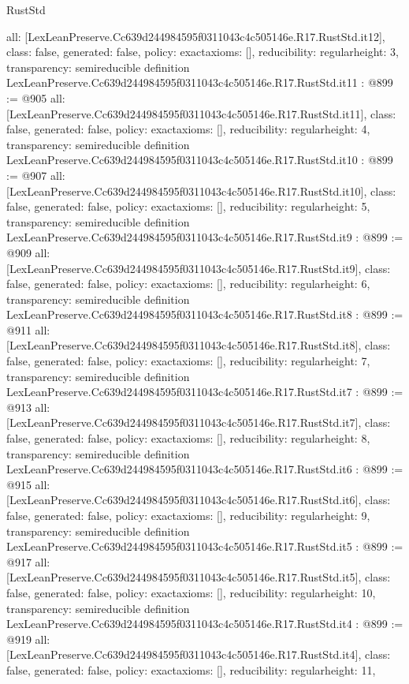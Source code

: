 \begin{lexlean}{RustStd}
\begin{coremodule}
{  all: [LexLeanPreserve.Cc639d244984595f0311043c4c505146e.R17.RustStd.it12],
  class: false,
  generated: false,
  policy: exact{axioms: []},
  reducibility: regular{height: 3},
  transparency: semireducible
}
definition LexLeanPreserve.Cc639d244984595f0311043c4c505146e.R17.RustStd.it11 : @899 := @905 {
  all: [LexLeanPreserve.Cc639d244984595f0311043c4c505146e.R17.RustStd.it11],
  class: false,
  generated: false,
  policy: exact{axioms: []},
  reducibility: regular{height: 4},
  transparency: semireducible
}
definition LexLeanPreserve.Cc639d244984595f0311043c4c505146e.R17.RustStd.it10 : @899 := @907 {
  all: [LexLeanPreserve.Cc639d244984595f0311043c4c505146e.R17.RustStd.it10],
  class: false,
  generated: false,
  policy: exact{axioms: []},
  reducibility: regular{height: 5},
  transparency: semireducible
}
definition LexLeanPreserve.Cc639d244984595f0311043c4c505146e.R17.RustStd.it9 : @899 := @909 {
  all: [LexLeanPreserve.Cc639d244984595f0311043c4c505146e.R17.RustStd.it9],
  class: false,
  generated: false,
  policy: exact{axioms: []},
  reducibility: regular{height: 6},
  transparency: semireducible
}
definition LexLeanPreserve.Cc639d244984595f0311043c4c505146e.R17.RustStd.it8 : @899 := @911 {
  all: [LexLeanPreserve.Cc639d244984595f0311043c4c505146e.R17.RustStd.it8],
  class: false,
  generated: false,
  policy: exact{axioms: []},
  reducibility: regular{height: 7},
  transparency: semireducible
}
definition LexLeanPreserve.Cc639d244984595f0311043c4c505146e.R17.RustStd.it7 : @899 := @913 {
  all: [LexLeanPreserve.Cc639d244984595f0311043c4c505146e.R17.RustStd.it7],
  class: false,
  generated: false,
  policy: exact{axioms: []},
  reducibility: regular{height: 8},
  transparency: semireducible
}
definition LexLeanPreserve.Cc639d244984595f0311043c4c505146e.R17.RustStd.it6 : @899 := @915 {
  all: [LexLeanPreserve.Cc639d244984595f0311043c4c505146e.R17.RustStd.it6],
  class: false,
  generated: false,
  policy: exact{axioms: []},
  reducibility: regular{height: 9},
  transparency: semireducible
}
definition LexLeanPreserve.Cc639d244984595f0311043c4c505146e.R17.RustStd.it5 : @899 := @917 {
  all: [LexLeanPreserve.Cc639d244984595f0311043c4c505146e.R17.RustStd.it5],
  class: false,
  generated: false,
  policy: exact{axioms: []},
  reducibility: regular{height: 10},
  transparency: semireducible
}
definition LexLeanPreserve.Cc639d244984595f0311043c4c505146e.R17.RustStd.it4 : @899 := @919 {
  all: [LexLeanPreserve.Cc639d244984595f0311043c4c505146e.R17.RustStd.it4],
  class: false,
  generated: false,
  policy: exact{axioms: []},
  reducibility: regular{height: 11},
}
\end{coremodule}
\end{lexlean}
